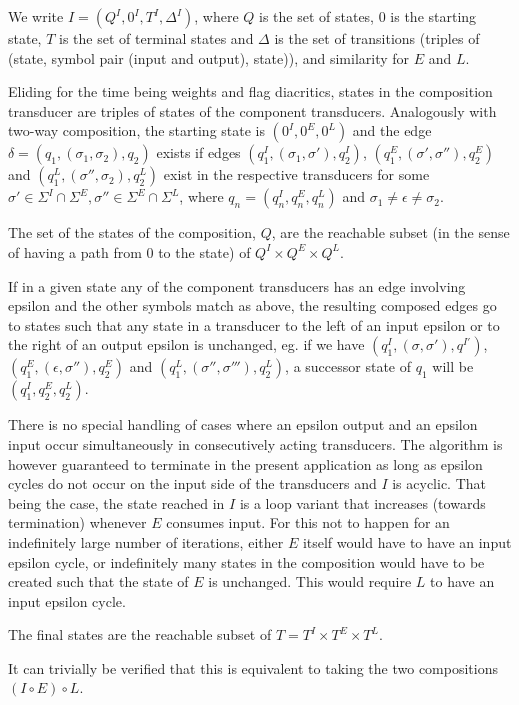 \documentclass{llncs}
\begin{document}
We write $I = (Q^I, 0^I, T^I, \Delta^I)$, where $Q$
is the set of states, $0$ is the starting state, $T$ is the set of terminal
states and $\Delta$ is the set of transitions (triples of (state, symbol pair
(input and output), state)), and similarity for $E$ and $L$.

Eliding for the time being weights and flag diacritics, states in the
composition transducer are triples of states of the component transducers.
Analogously with two-way composition, the starting state is $(0^I, 0^E, 0^L)$
and the edge $\delta = (q_1, (\sigma_1, \sigma_2), q_2)$ exists if edges
$(q^I_1, (\sigma_1, \sigma'), q^I_2)$,
$(q^E_1, (\sigma', \sigma''), q^E_2)$ and
$(q^L_1, (\sigma'', \sigma_2), q^L_2)$ exist in the respective transducers
for some
$\sigma' \in \Sigma^I \cap \Sigma^E, \sigma'' \in \Sigma^E \cap \Sigma^L$,
where $q_n = (q^I_n, q^E_n, q^L_n)$ and $\sigma_1 \neq \epsilon \neq \sigma_2$.

The set of the states of the composition, $Q$, are the reachable subset
(in the sense of having a path from $0$ to the state) of
$Q^I \times Q^E \times Q^L$.

If in a given state any of the component transducers has an edge involving
epsilon and the other symbols match as above, the resulting composed edges
go to states such that any state in a transducer to the left of an input
epsilon or to the right of an output epsilon is unchanged, eg. if we have
$(q^I_1, (\sigma, \sigma'), q^{I'})$, $(q^E_1, (\epsilon, \sigma''), q^E_2)$ and
$(q^L_1, (\sigma'', \sigma'''), q^L_2)$, a successor state of $q_1$ will be
$(q^I_1, q^E_2, q^L_2)$.

There is no special handling of cases where an epsilon output and an epsilon
input occur simultaneously in consecutively acting transducers. The algorithm
is however guaranteed to terminate in the present application as long as
epsilon cycles do not occur on the input side of the transducers and $I$
is acyclic. That being the case, the state reached in $I$ is a loop variant
that increases (towards termination) whenever $E$ consumes input. For this
not to happen for an indefinitely large number of iterations, either $E$
itself would have to have an input epsilon cycle, or indefinitely many states
in the composition would have to be created such that the state of $E$ is
unchanged. This would require $L$ to have an input epsilon cycle.

The final states are the reachable subset of $T = T^I \times T^E \times T^L$.

It can trivially be verified that this is equivalent to taking the two
compositions $(I \circ E) \circ L$.
\end{document}
